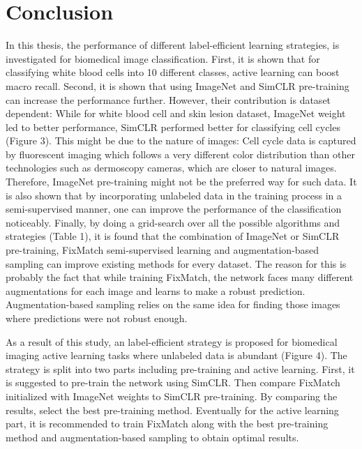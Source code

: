 
\chapter{Conclusion}\label{chapter:conclusion}

In this thesis, the performance of different label-efficient learning strategies, is investigated for biomedical image classification. First, it is shown that for classifying white blood cells into 10 different classes, active learning can boost macro recall. Second, it is shown that using ImageNet and SimCLR pre-training can increase the performance further. However, their contribution is dataset dependent: While for white blood cell and skin lesion dataset, ImageNet weight led to better performance, SimCLR performed better for classifying cell cycles (Figure 3). This might be due to the nature of images: Cell cycle data is captured by fluorescent imaging which follows a very different color distribution than other technologies such as dermoscopy cameras, which are closer to natural images. Therefore, ImageNet pre-training might not be the preferred way for such data.
It is also shown that by incorporating unlabeled data in the training process in a semi-supervised manner, one can improve the performance of the classification noticeably. Finally, by doing a grid-search over all the possible algorithms and strategies (Table 1), it is found that the combination of ImageNet or SimCLR pre-training, FixMatch semi-supervised learning and augmentation-based sampling can improve existing methods for every dataset. The reason for this is probably the fact that while training FixMatch, the network faces many different augmentations for each image and learns to make a robust prediction. Augmentation-based sampling relies on the same idea for finding those images where predictions were not robust enough. 

As a result of this study, an label-efficient strategy is proposed for biomedical imaging active learning tasks where unlabeled data is abundant (Figure 4). The strategy is split into two parts including pre-training and active learning. First, it is suggested to pre-train the network using SimCLR. Then compare FixMatch initialized with ImageNet weights to SimCLR pre-training. By comparing the results, select the best pre-training method. Eventually for the active learning part, it is recommended to train FixMatch along with the best pre-training method and augmentation-based sampling to obtain optimal results.

